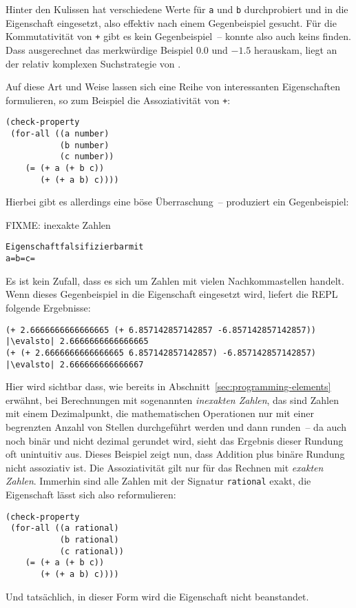 Hinter den Kulissen hat \drscheme{} verschiedene Werte für \lstinline{a} und
\lstinline{b} durchprobiert und in die Eigenschaft eingesetzt, also effektiv
nach einem Gegenbeispiel gesucht.  Für die Kommutativität von
\lstinline{+} gibt es kein Gegenbeispiel~-- \drscheme{} konnte also auch
keins finden.  Dass ausgerechnet das merkwürdige Beispiel $0.0$ und
$-1.5$ herauskam, liegt an der relativ komplexen Suchstrategie von
\drscheme{}.

Auf diese Art und Weise lassen sich eine Reihe von interessanten
Eigenschaften formulieren, so zum Beispiel die Assoziativität von
\lstinline{+}:\label{sec:plus-not-associative}
%
\begin{lstlisting}
(check-property
 (for-all ((a number)
           (b number)
           (c number))
    (= (+ a (+ b c))
       (+ (+ a b) c))))
\end{lstlisting}
%
Hierbei gibt es allerdings eine böse Überraschung~-- \drscheme{} produziert
ein Gegenbeispiel:

FIXME: inexakte Zahlen

%
\begin{alltt}
Eigenschaft falsifizierbar mit
  a =  b =  c = 
\end{alltt}
%
Es ist kein Zufall, dass es sich um Zahlen mit vielen Nachkommastellen
handelt.  Wenn dieses Gegenbeispiel in die Eigenschaft eingesetzt
wird, liefert die REPL folgende Ergebnisse:
%
\begin{lstlisting}
(+ 2.6666666666666665 (+ 6.857142857142857 -6.857142857142857))
|\evalsto| 2.6666666666666665
(+ (+ 2.6666666666666665 6.857142857142857) -6.857142857142857)
|\evalsto| 2.666666666666667
\end{lstlisting}
%
Hier wird sichtbar dass, wie bereits in
Abschnitt~\ref{sec:programming-elements} erwähnt, bei Berechnungen mit
sogenannten \textit{inexakten Zahlen}, das sind
Zahlen mit einem Dezimalpunkt, die mathematischen Operationen nur mit
einer begrenzten Anzahl von Stellen durchgeführt werden und dann runden~-- da
auch noch binär und nicht dezimal gerundet wird, sieht das Ergebnis
dieser Rundung oft unintuitiv aus.  Dieses Beispiel zeigt nun, dass
Addition plus binäre Rundung nicht assoziativ ist.  Die Assoziativität
gilt nur für das Rechnen mit \textit{exakten Zahlen}.  Immerhin sind alle Zahlen mit der Signatur
\lstinline{rational} exakt, die
Eigenschaft lässt sich also reformulieren:
%
\begin{lstlisting}
(check-property
 (for-all ((a rational)
           (b rational)
           (c rational))
    (= (+ a (+ b c))
       (+ (+ a b) c))))
\end{lstlisting}
%
Und tatsächlich, in dieser Form wird die Eigenschaft nicht
beanstandet.

